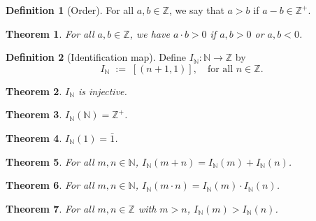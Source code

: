 \documentclass[10pt]{article}
\newtheorem{theorem}{Theorem}[section]
\theoremstyle{definition}
\newtheorem*{definition}{Definition}
\theoremstyle{remark}
\begin{document}
        \begin{definition}[Order]
                For all $a, b \in \mathbb{Z}$, we say that $a > b$ if $a - b \in \mathbb{Z}^+$.
        \end{definition}

        \begin{theorem}
                For all $a, b \in \mathbb{Z}$, we have $a\cdot b > 0$ if $a, b > 0$ or $a, b < 0$.
        \end{theorem}

        \begin{definition}[Identification map]
                Define $I_\mathbb{N}\colon \mathbb{N}\to \mathbb{Z}$ by 
                \[
                        I_\mathbb{N} \;:=\; [(n + 1, 1)],\quad\text{for all }n \in \mathbb{Z}.
                \]
        \end{definition}

        \begin{theorem}
                $I_{\mathbb{N}}$ is injective.
        \end{theorem}

        \begin{theorem}
                $I_{\mathbb{N}}(\mathbb{N}) = \mathbb{Z}^+$.
        \end{theorem}

        \begin{theorem}
                $I_{\mathbb{N}}(1) = \bar{1}$.
        \end{theorem}

        \begin{theorem}
                For all $m, n \in \mathbb{N}$, $I_{\mathbb{N}}(m + n) = I_{\mathbb{N}}(m) + I_{\mathbb{N}}(n)$.
        \end{theorem}

        \begin{theorem}
                For all $m, n \in \mathbb{N}$, $I_{\mathbb{N}}(m \cdot n) = I_{\mathbb{N}}(m) \cdot I_{\mathbb{N}}(n)$.
        \end{theorem}

        \begin{theorem}
                For all $m, n \in \mathbb{Z}$ with $m > n$, $I_{\mathbb{N}}(m) > I_{\mathbb{N}}(n)$.
        \end{theorem}
\end{document}
